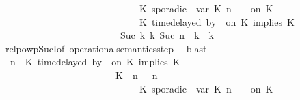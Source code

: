 \begin{isabellebody}
\ \ \ \ \ \ \ \ \ \ \ \ \ \ \ \ \ \ \ \ \ \ \ \ \ \ \ \ {\isasymturnstile}\ {\isacharparenleft}K\ sporadic{\isasymsharp}\ {\isasymlparr}\ {\isasymtau}\isactrlsub v\isactrlsub a\isactrlsub r\ {\isacharparenleft}K\ n{\isacharparenright}\ {\isasymoplus}\ {\isasymdelta}{\isasymtau}\ {\isasymrparr}\ on\ K\ {\isacharhash}\ {\isasymPsi}\isanewline
\ \ \ \ \ \ \ \ \ \ \ \ \ \ \ \ \ \ \ \ \ \ \ \ \ \ \ \ {\isasymtriangleright}\ {\isacharparenleft}{\isacharparenleft}K\ time{\isacharminus}delayed{\isasymsharp}\ by\ {\isasymdelta}{\isasymtau}\ on\ K\ implies\ K\ {\isacharhash}\ {\isasymPhi}{\isacharparenright}{\isacharparenright}\isanewline
\ \ \ \ \ \ \ \ \ \ \ \ \ \ \ \ \ \ \ \ \ \ \ \ \ {\isasymhookrightarrow}\isactrlbsup Suc\ k\isactrlesup \ {\isacharparenleft}{\isasymGamma}\isactrlsub k{\isacharcomma}\ Suc\ n\ {\isasymturnstile}\ {\isasymPsi}\isactrlsub k\ {\isasymtriangleright}\ {\isasymPhi}\isactrlsub k{\isacharparenright}{\isacartoucheclose}\isanewline
\ \ \ \ \ \ \ \ \ \ \ \ \isamarkupfalse%
\ relpowp{\isacharunderscore}Suc{\isacharunderscore}I{}{\isacharbrackleft}of\ {\isacartoucheopen}operational{\isacharunderscore}semantics{\isacharunderscore}step{\isacartoucheclose}{\isacharbrackright}\ \isamarkupfalse%
\ blast\isanewline
\ \ \ \ \ \ \ \ \ \ \isamarkupfalse%
\ \isamarkupfalse%
\ {\isacartoucheopen}{\isacharparenleft}{\isasymGamma}{\isacharcomma}\ n\ {\isasymturnstile}\ {\isacharparenleft}{\isacharparenleft}K\ time{\isacharminus}delayed{\isasymsharp}\ by\ {\isasymdelta}{\isasymtau}\ on\ K\ implies\ K\ {\isacharhash}\ {\isasymPsi}{\isacharparenright}\ {\isasymtriangleright}\ {\isasymPhi}{\isacharparenright}\isanewline
\ \ \ \ \ \ \ \ \ \ \ \ \ \ \ \ \ \ \ \ \ \ {\isasymhookrightarrow}\ {\isacharparenleft}\ {\isacharparenleft}{\isacharparenleft}K\ {\isasymUp}\ n{\isacharparenright}\ {\isacharhash}\ {\isasymGamma}{\isacharparenright}{\isacharcomma}\ n\isanewline
\ \ \ \ \ \ \ \ \ \ \ \ \ \ \ \ \ \ \ \ \ \ \ \ \ \ \ \ {\isasymturnstile}\ {\isacharparenleft}K\ sporadic{\isasymsharp}\ {\isasymlparr}\ {\isasymtau}\isactrlsub v\isactrlsub a\isactrlsub r\ {\isacharparenleft}K\ n{\isacharparenright}\ {\isasymoplus}\ {\isasymdelta}{\isasymtau}\ {\isasymrparr}\ on\ K\ {\isacharhash}\ {\isasymPsi}\isanewline

\end{isabellebody}
